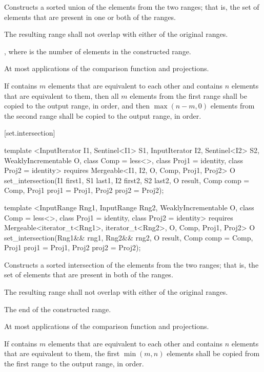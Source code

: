 \begin{itemdescr}
\pnum
\effects
Constructs a sorted union of the elements from the two ranges;
that is, the set of elements that are present in one or both of the ranges.

\pnum
\requires
The resulting range shall not overlap with either of the original ranges.

\pnum
\returns
{}, where  is
the number of elements in the constructed range.

\pnum
\complexity
At most
applications of the comparison function and projections.

\pnum
\notes If  contains $m$ elements that are equivalent to
each other and  contains $n$ elements that are equivalent
to them, then all $m$ elements from the first range shall be copied to the output
range, in order, and then $\max(n - m, 0)$ elements from the second range shall
be copied to the output range, in order.
\end{itemdescr}

[set.intersection]{}

%
\begin{itemdecl}
template <InputIterator I1, Sentinel<I1> S1, InputIterator I2, Sentinel<I2> S2,
    WeaklyIncrementable O, class Comp = less<>, class Proj1 = identity, class Proj2 = identity>
  requires Mergeable<I1, I2, O, Comp, Proj1, Proj2>
  O
    set_intersection(I1 first1, S1 last1, I2 first2, S2 last2, O result,
                     Comp comp = Comp{}, Proj1 proj1 = Proj1{}, Proj2 proj2 = Proj2{});

template <InputRange Rng1, InputRange Rng2, WeaklyIncrementable O,
    class Comp = less<>, class Proj1 = identity, class Proj2 = identity>
  requires Mergeable<iterator_t<Rng1>, iterator_t<Rng2>, O, Comp, Proj1, Proj2>
  O
    set_intersection(Rng1&& rng1, Rng2&& rng2, O result,
                     Comp comp = Comp{}, Proj1 proj1 = Proj1{}, Proj2 proj2 = Proj2{});
\end{itemdecl}

\begin{itemdescr}
\pnum
\effects
Constructs a sorted intersection of the elements from the two ranges;
that is, the set of elements that are present in both of the ranges.

\pnum
\requires
The resulting range shall not overlap with either of the original ranges.

\pnum
\returns
The end of the constructed range.

\pnum
\complexity
At most
applications of the comparison function and projections.

\pnum
\notes If  contains $m$ elements that are equivalent to
each other and  contains $n$ elements that are equivalent
to them, the first $\min(m, n)$ elements shall be copied from the first range
to the output range, in order.
\end{itemdescr}

